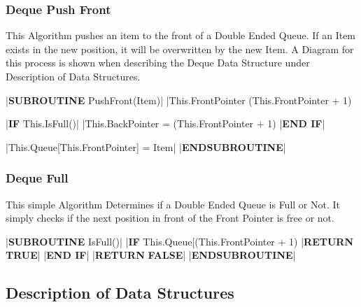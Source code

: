 \begin{flushleft}
                \vspace{0.5cm}
            \subsubsection{Deque Push Front}
                This Algorithm pushes an item to the front of a Double Ended Queue. If an Item exists in the new position, it will be overwritten by
                the new Item. A Diagram for this process is shown when describing the Deque Data Structure under Description of Data Structures.
                \vspace{0.2cm}

                \begin{pseudocode}
|\textbf{SUBROUTINE} PushFront(Item)|
    |This.FrontPointer \leftarrow (This.FrontPointer + 1) %

    |\textbf{IF} This.IsFull()|
        |This.BackPointer = (This.FrontPointer + 1) %
    |\textbf{END IF}|
    
    |This.Queue[This.FrontPointer] = Item|
|\textbf{ENDSUBROUTINE}|
                \end{pseudocode}

                \vspace{0.5cm}
            \subsubsection{Deque Full}
                This simple Algorithm Determines if a Double Ended Queue is Full or Not. It simply checks if the next position in front of the
                Front Pointer is free or not.
                \vspace{0.2cm}

                \begin{pseudocode}
|\textbf{SUBROUTINE} IsFull()|
    |\textbf{IF} This.Queue[(This.FrontPointer + 1) %
        |\textbf{RETURN} \textbf{TRUE}|
    |\textbf{END IF}|
    |\textbf{RETURN} \textbf{FALSE}|
|\textbf{ENDSUBROUTINE}|
                \end{pseudocode}

                \vspace{0.5cm}
        \subsection{Description of Data Structures}

\end{flushleft}
